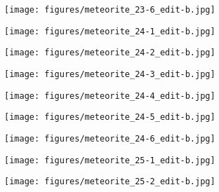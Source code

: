 \documentclass[a4paper, 11pt, oneside]{article}
\begin{document}
\clearpage
\begin{figure}[t]
\texttt{[image: figures/meteorite\_23-6\_edit-b.jpg]}
\caption{}
\centering
\end{figure}
\clearpage
{}
\begin{figure}[t]
\texttt{[image: figures/meteorite\_24-1\_edit-b.jpg]}
\caption{}
\centering
\end{figure}
\clearpage
\begin{figure}[t]
\texttt{[image: figures/meteorite\_24-2\_edit-b.jpg]}
\caption{}
\centering
\end{figure}
\clearpage
\begin{figure}[t]
\texttt{[image: figures/meteorite\_24-3\_edit-b.jpg]}
\caption{}
\centering
\end{figure}
\clearpage
\begin{figure}[t]
\texttt{[image: figures/meteorite\_24-4\_edit-b.jpg]}
\caption{}
\centering
\end{figure}
\clearpage
\begin{figure}[t]
\texttt{[image: figures/meteorite\_24-5\_edit-b.jpg]}
\caption{}
\centering
\end{figure}
\clearpage
\begin{figure}[t]
\texttt{[image: figures/meteorite\_24-6\_edit-b.jpg]}
\caption{}
\centering
\end{figure}
\clearpage
{}
\begin{figure}[t]
\texttt{[image: figures/meteorite\_25-1\_edit-b.jpg]}
\caption{}
\centering
\end{figure}
\clearpage
\begin{figure}[t]
\texttt{[image: figures/meteorite\_25-2\_edit-b.jpg]}
\caption{}
\centering
\end{figure}
\end{document}
